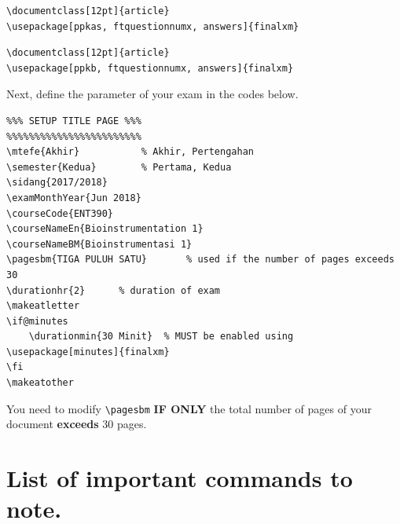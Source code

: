 \documentclass[12pt]{article}
\begin{document}
\begin{lstlisting}[basicstyle=\footnotesize, frame=single]
% For PPKAS
\documentclass[12pt]{article}	
\usepackage[ppkas, ftquestionnumx, answers]{finalxm}	
\end{lstlisting}

\begin{lstlisting}[basicstyle=\footnotesize, frame=single]
% For PPKB
\documentclass[12pt]{article}	
\usepackage[ppkb, ftquestionnumx, answers]{finalxm}	
\end{lstlisting}

\clearpage 
Next, define the parameter of your exam in the codes below.

\begin{lstlisting}[basicstyle=\footnotesize, frame=single]
%%%%%%%%%%%%%%%%%%%%%%%%
%%% SETUP TITLE PAGE %%%
%%%%%%%%%%%%%%%%%%%%%%%%
\mtefe{Akhir} 			% Akhir, Pertengahan
\semester{Kedua}		% Pertama, Kedua
\sidang{2017/2018}		
\examMonthYear{Jun 2018}
\courseCode{ENT390}
\courseNameEn{Bioinstrumentation 1}
\courseNameBM{Bioinstrumentasi 1}
\pagesbm{TIGA PULUH SATU}		% used if the number of pages exceeds 30
\durationhr{2}		% duration of exam
\makeatletter 
\if@minutes
	\durationmin{30 Minit}	% MUST be enabled using \usepackage[minutes]{finalxm}
\fi 		
\makeatother
\end{lstlisting}

\bigskip
You need to modify \verb|\pagesbm| \textbf{IF ONLY} the total number of pages of your document \textbf{exceeds} 30 pages. 

\section{List of important commands to note.}
\end{document}
